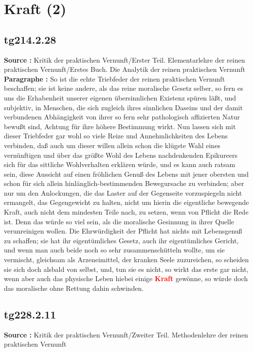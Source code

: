 \documentclass[a4paper,12pt,twoside]{book}
\newcommand{\match}[1]{\textcolor{red}{\textbf{#1}}}
\newcommand{\unnumberedsection}[1]{
	\section*{#1}
	\addcontentsline{toc}{section}{#1}
	\markright{#1}
}
\begin{document}
	\unnumberedsection{Kraft (2)} 
	\subsection*{tg214.2.28} 
	\textbf{Source : }Kritik der praktischen Vernunft/Erster Teil. Elementarlehre der reinen praktischen Vernunft/Erstes Buch. Die Analytik der reinen praktischen Vernunft\\  
	
	\textbf{Paragraphe : }So ist die echte Triebfeder der reinen praktischen Vernunft beschaffen; sie ist keine andere, als das reine moralische Gesetz selber, so fern es uns die Erhabenheit unserer eigenen übersinnlichen Existenz spüren läßt, und subjektiv,  in Menschen, die sich zugleich ihres sinnlichen Daseins und der damit verbundenen Abhängigkeit von ihrer so fern sehr pathologisch affizierten Natur bewußt sind, Achtung für ihre höhere Bestimmung wirkt. Nun lassen sich mit dieser Triebfeder gar wohl so viele Reize und Annehmlichkeiten des Lebens verbinden, daß auch um dieser willen allein schon die klügste Wahl eines vernünftigen und über das größte Wohl des Lebens nachdenkenden Epikureers sich für das sittliche Wohlverhalten erklären würde, und es kann auch ratsam sein, diese Aussicht auf einen fröhlichen Genuß des Lebens mit jener obersten und schon für sich allein hinlänglich-bestimmenden Bewegursache zu verbinden; aber nur um den Anlockungen, die das Laster auf der Gegenseite vorzuspiegeln nicht ermangelt, das Gegengewicht zu halten, nicht um hierin die eigentliche bewegende Kraft, auch nicht dem mindesten Teile nach, zu setzen, wenn von Pflicht die Rede ist. Denn das würde so viel sein, als die moralische Gesinnung in ihrer Quelle verunreinigen wollen. Die Ehrwürdigkeit der Pflicht hat nichts mit Lebensgenuß zu schaffen; sie hat ihr eigentümliches Gesetz, auch ihr eigentümliches Gericht, und wenn man auch beide noch so sehr zusammenschütteln wollte, um sie vermischt, gleichsam als Arzeneimittel, der kranken Seele zuzureichen, so scheiden sie sich doch alsbald von selbst, und, tun sie es nicht, so wirkt das erste gar nicht, wenn aber auch das physische Leben hiebei einige \match{Kraft} gewönne, so würde doch das moralische ohne Rettung dahin schwinden. 
	
	\subsection*{tg228.2.11} 
	\textbf{Source : }Kritik der praktischen Vernunft/Zweiter Teil. Methodenlehre der reinen praktischen Vernunft\\  
	
\end{document}
